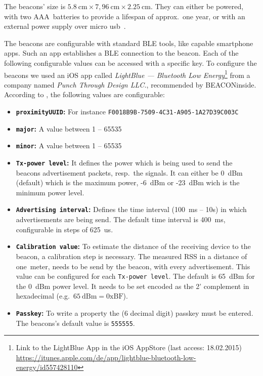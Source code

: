 The beacons' size is $5.8~\text{cm} \times 7,96~\text{cm} \times 2.25~\text{cm}$. They can either be powered, with two AAA~batteries to provide a lifespan of approx.\ one year, or with an external power supply over micro usb~\citep{binside:ds}.

The beacons are configurable with standard \ac{BLE} tools, like capable smartphone apps. Such an app establishes a \ac{BLE} connection to the beacon. Each of the following configurable values can be accessed with a specific key. To configure the beacons we used an iOS app called \emph{LightBlue --- Bluetooth Low Energy}\footnote{Link to the LightBlue App in the iOS AppStore (last access: 18.02.2015) \url{https://itunes.apple.com/de/app/lightblue-bluetooth-low-energy/id557428110}} from a company named \textit{Punch Through Design LLC.}, recommended by BEACONinside. According to \citep{binside:ds}, the following values are configurable:
\begin{itemize}
  \item \textbf{\texttt{proximityUUID}:} For instance \texttt{F0018B9B-7509-4C31-A905-1A27D39C003C}
  \item \textbf{\texttt{major}:} A value between 1 -- 65535
  \item \textbf{\texttt{minor}:} A value between 1 -- 65535
  \item \textbf{\texttt{Tx-power level}:} It defines the power which is being used to send the beacons advertisement packets, resp.\ the signals. It can either be 0~dBm (default) which is the maximum power, -6~dBm or -23~dBm wich is the minimum power level.
  \item \textbf{\texttt{Advertising interval}:} Defines the time interval (100~ms -- 10s) in which advertisements are being send. The default time interval is 400~ms, configurable in steps of 625~us.
  \item \textbf{\texttt{Calibration value}:} To estimate the distance of the receiving device to the beacon, a calibration step is necessary. The measured \acs{RSS} in a distance of one~meter, needs to be send by the beacon, with every advertisement. This value can be configured for each \texttt{Tx-power level}. The default is 65~dBm for the 0~dBm power level. It needs to be set encoded as the 2' complement in hexadecimal (e.g.\ $65~\text{dBm} = \text{0xBF}$).
  \item \textbf{\texttt{Passkey}:} To write a property the (6 decimal digit) passkey must be entered. The beacons's default value is \texttt{555555}.
\end{itemize}

